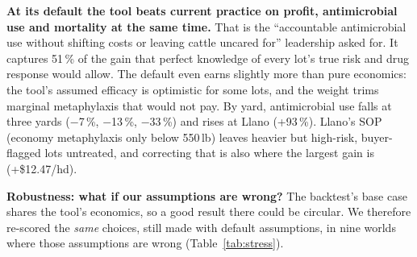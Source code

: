 \documentclass[10pt,letterpaper]{article}
\newcommand{\pct}{\,\%}
\newcommand{\usd}[1]{\$#1}
\newcommand{\lead}[1]{\textbf{#1}\enspace}
\begin{document}
\textbf{At its default the tool beats current practice on profit, antimicrobial use and mortality at the same time.} That is the ``accountable antimicrobial use without shifting costs or leaving cattle uncared for'' leadership asked for. It captures 51\pct{} of the gain that perfect knowledge of every lot's true risk and drug response would allow. The default even earns slightly more than pure economics: the tool's assumed efficacy is optimistic for some lots, and the weight trims marginal metaphylaxis that would not pay. By yard, antimicrobial use falls at three yards ($-$7\pct, $-$13\pct, $-$33\pct) and rises at Llano (+93\pct). Llano's SOP (economy metaphylaxis only below 550\,lb) leaves heavier but high-risk, buyer-flagged lots untreated, and correcting that is also where the largest gain is (+\usd{12.47}/hd).

\lead{Robustness: what if our assumptions are wrong?} The backtest's base case shares the tool's economics, so a good result there could be circular. We therefore re-scored the \emph{same} choices, still made with default assumptions, in nine worlds where those assumptions are wrong (Table~\ref{tab:stress}).
\end{document}

